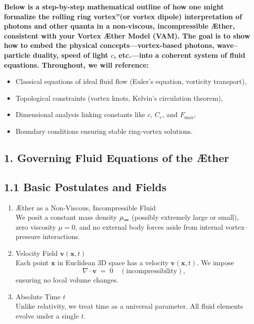 
\textbf{Below is a step-by-step mathematical outline of how one might formalize the \grqq rolling ring vortex\textquotedblright (or vortex dipole) interpretation of photons and other quanta in a non-viscous, incompressible Æther, consistent with your Vortex Æther Model (VAM). The goal is to show how to embed the physical concepts—vortex-based photons, wave–particle duality, speed of light \(c\), etc.—into a coherent system of fluid equations. Throughout, we will reference:}

\begin{itemize}
 \item Classical equations of ideal fluid flow (Euler's equation, vorticity transport),
 \item Topological constraints (vortex knots, Kelvin's circulation theorem),
 \item Dimensional analysis linking constants like \(c\), \(C_e\), and \(F_{\max}\),
 \item Boundary conditions ensuring stable ring-vortex solutions.
\end{itemize}

\subsection*{1. Governing Fluid Equations of the Æther}
\subsection*{1.1 Basic Postulates and Fields}
\begin{enumerate}
 \item Æther as a Non-Viscous, Incompressible Fluid\\
 We posit a constant mass density \(\rho_{\scriptscriptstyle \mathrm{\ae}}\) (possibly extremely large or small), zero viscosity \(\mu=0\), and no external body forces aside from internal vortex–pressure interactions.

 \item Velocity Field \(\mathbf{v}(\mathbf{x},t)\)\\
 Each point \(\mathbf{x}\) in Euclidean 3D space has a velocity \(\mathbf{v}(\mathbf{x},t)\). We impose
 \[
  \nabla \cdot \mathbf{v} \;=\; 0 \quad (\text{incompressibility}),
 \]
 ensuring no local volume changes.

 \item Absolute Time \(t\)\\
 Unlike relativity, we treat time as a universal parameter. All fluid elements evolve under a single \(t\).
\end{enumerate}

